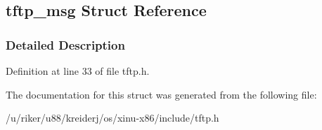 \hypertarget{structtftp__msg}{}\subsection{tftp\+\_\+msg Struct Reference}
\label{structtftp__msg}


\subsubsection{Detailed Description}


Definition at line 33 of file tftp.\+h.



The documentation for this struct was generated from the following file\+:\begin{DoxyCompactItemize}
\item 
/u/riker/u88/kreiderj/os/xinu-\/x86/include/tftp.\+h\end{DoxyCompactItemize}
